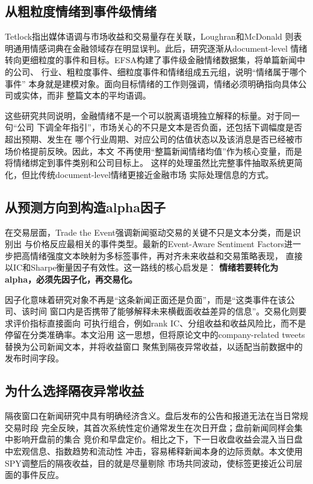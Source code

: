 \documentclass[UTF8,a4paper,10pt,twocolumn,fontset=none]{ctexart}
\begin{document}
\subsection{从粗粒度情绪到事件级情绪}

Tetlock指出媒体语调与市场收益和交易量存在关联\cite{tetlock}，Loughran和McDonald
则表明通用情感词典在金融领域存在明显误判\cite{lm}。此后，研究逐渐从document-level
情绪转向更细粒度的事件和目标。EFSA构建了事件级金融情绪数据集，将单篇新闻中的公司、
行业、粗粒度事件、细粒度事件和情绪组成五元组\cite{efsa}，说明“情绪属于哪个事件”
本身就是建模对象。面向目标情绪的工作则强调，情绪必须明确指向具体公司或实体，而非
整篇文本的平均语调\cite{targetsentiment}。

这些研究共同说明，金融情绪不是一个可以脱离语境独立解释的标量。对于同一句“公司
下调全年指引”，市场关心的不只是文本是否负面，还包括下调幅度是否超出预期、发生在
哪个行业周期、对应公司的估值状态以及该消息是否已经被市场价格提前反映。因此，本文
不再使用“整篇新闻情绪均值”作为核心变量，而是将情绪绑定到事件类别和公司目标上。
这样的处理虽然比完整事件抽取系统更简化，但比传统document-level情绪更接近金融市场
实际处理信息的方式。

\subsection{从预测方向到构造alpha因子}

在交易层面，Trade the Event强调新闻驱动交易的关键不只是文本分类，而是识别出
与价格反应最相关的事件类型\cite{tradetheevent}。最新的Event-Aware Sentiment
Factors进一步把高情绪强度文本映射为多标签事件，再对齐未来收益和交易策略表现，
直接以IC和Sharpe衡量因子有效性\cite{eventawarefactor}。这一路线的核心启发是：
\textbf{情绪若要转化为alpha，必须先因子化，再交易化。}

因子化意味着研究对象不再是“这条新闻正面还是负面”，而是“这类事件在该公司、该时间
窗口内是否携带了能够解释未来横截面收益差异的信息”。交易化则要求评价指标直接面向
可执行组合，例如rank IC、分组收益和收益风险比，而不是停留在分类准确率。本文沿用
这一思想，但将原论文中的company-related tweets替换为公司新闻文本，并将收益窗口
聚焦到隔夜异常收益，以适配当前数据中的发布时间字段。

\subsection{为什么选择隔夜异常收益}

隔夜窗口在新闻研究中具有明确经济含义。盘后发布的公告和报道无法在当日常规交易时段
完全反映，其首次系统性定价通常发生在次日开盘；盘前新闻同样会集中影响开盘前的集合
竞价和早盘定价。相比之下，下一日收盘收益会混入当日盘中宏观信息、指数趋势和流动性
冲击，容易稀释新闻本身的边际贡献。本文使用SPY调整后的隔夜收益，目的就是尽量剔除
市场共同波动，使标签更接近公司层面的事件反应。
\end{document}
